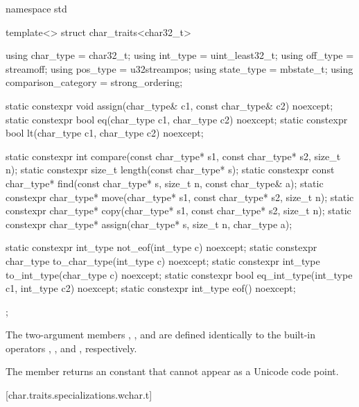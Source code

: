 %
\begin{codeblock}
namespace std {
  template<> struct char_traits<char32_t> {
    using char_type  = char32_t;
    using int_type   = uint_least32_t;
    using off_type   = streamoff;
    using pos_type   = u32streampos;
    using state_type = mbstate_t;
    using comparison_category = strong_ordering;

    static constexpr void assign(char_type& c1, const char_type& c2) noexcept;
    static constexpr bool eq(char_type c1, char_type c2) noexcept;
    static constexpr bool lt(char_type c1, char_type c2) noexcept;

    static constexpr int compare(const char_type* s1, const char_type* s2, size_t n);
    static constexpr size_t length(const char_type* s);
    static constexpr const char_type* find(const char_type* s, size_t n,
                                           const char_type& a);
    static constexpr char_type* move(char_type* s1, const char_type* s2, size_t n);
    static constexpr char_type* copy(char_type* s1, const char_type* s2, size_t n);
    static constexpr char_type* assign(char_type* s, size_t n, char_type a);

    static constexpr int_type not_eof(int_type c) noexcept;
    static constexpr char_type to_char_type(int_type c) noexcept;
    static constexpr int_type to_int_type(char_type c) noexcept;
    static constexpr bool eq_int_type(int_type c1, int_type c2) noexcept;
    static constexpr int_type eof() noexcept;
  };
}
\end{codeblock}


\pnum
The two-argument members ,
, and  are defined identically to
the built-in operators \tcode{=}, \tcode{==}, and
\tcode{<}, respectively.

\pnum
The member  returns an
 constant that cannot appear as a Unicode
code point.

[char.traits.specializations.wchar.t]{}

